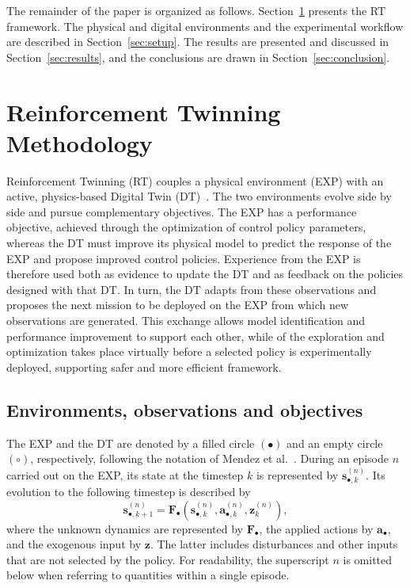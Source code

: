 \documentclass[journal]{IEEEtran}
\begin{document}
The remainder of the paper is organized as follows. Section~\ref{sec:methodology} presents the RT framework. The physical and digital environments and the experimental workflow are described in Section~\ref{sec:setup}. The results are presented and discussed in Section~\ref{sec:results}, and the conclusions are drawn in Section~\ref{sec:conclusion}.

\section{Reinforcement Twinning Methodology}
\label{sec:methodology}
\label{sec:rt-framework}

Reinforcement Twinning (RT) couples a physical environment (EXP) with an active, physics-based Digital Twin (DT)~\cite{SchenaRT2023,Mendez2026}. The two environments evolve side by side and pursue complementary objectives. The EXP has a performance objective, achieved through the optimization of control policy parameters, whereas the DT must improve its physical model to predict the response of the EXP and propose improved control policies. Experience from the EXP is therefore used both as evidence to update the DT and as feedback on the policies designed with that DT. In turn, the DT adapts from these observations and proposes the next mission to be deployed on the EXP from which new observations are generated. This exchange allows model identification and performance improvement to support each other, while of the exploration and optimization takes place virtually before a selected policy is experimentally deployed, supporting safer and more efficient framework.

\subsection{Environments, observations and objectives}
The EXP and the DT are denoted by a filled circle $(\bullet)$ and an empty circle $(\circ)$, respectively, following the notation of Mendez et al.~\cite{Mendez2026}. During an episode $n$ carried out on the EXP, its state at the timestep $k$ is represented by $\mathbf s_{\bullet,k}^{(n)}$. Its evolution to the following timestep is described by
\begin{equation}
 \mathbf s_{\bullet,k+1}^{(n)}
 =\mathbf F_\bullet\!\left(\mathbf s_{\bullet,k}^{(n)},
 \mathbf a_{\bullet,k}^{(n)},\mathbf z_k^{(n)}\right),
 \label{eq:rt-physical-state}
\end{equation}
where the unknown dynamics are represented by $\mathbf F_\bullet$, the applied actions by $\mathbf a_\bullet$, and the exogenous input by $\mathbf z$. The latter includes disturbances and other inputs that are not selected by the policy. For readability, the superscript $n$ is omitted below when referring to quantities within a single episode.
\end{document}

